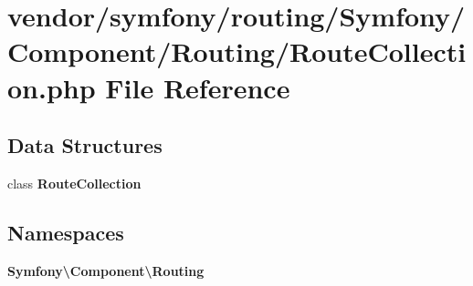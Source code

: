 \section{vendor/symfony/routing/\+Symfony/\+Component/\+Routing/\+Route\+Collection.php File Reference}
\label{symfony_2routing_2_symfony_2_component_2_routing_2_route_collection_8php}
\subsection*{Data Structures}
\begin{DoxyCompactItemize}
\item 
class {\bf Route\+Collection}
\end{DoxyCompactItemize}
\subsection*{Namespaces}
\begin{DoxyCompactItemize}
\item 
 {\bf Symfony\textbackslash{}\+Component\textbackslash{}\+Routing}
\end{DoxyCompactItemize}
